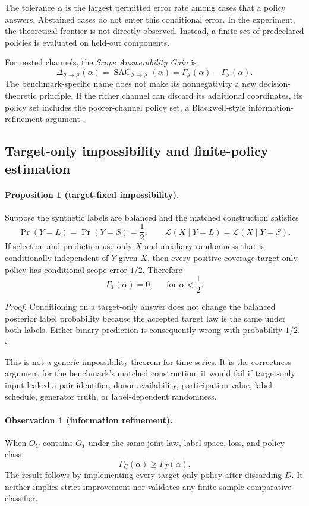 The tolerance $\alpha$ is the largest permitted error rate among cases that a
policy answers. Abstained cases do not enter this conditional error. In the
experiment, the theoretical frontier is not directly observed. Instead, a
finite set of predeclared policies is evaluated on held-out components.

For nested channels, the \emph{Scope Answerability Gain} is
\[
  \Delta_{\mathcal I\to\mathcal J}(\alpha)
  =\operatorname{SAG}_{\mathcal I\to\mathcal J}(\alpha)
  =\Gamma_{\mathcal J}(\alpha)-\Gamma_{\mathcal I}(\alpha).
\]
The benchmark-specific name does not make its nonnegativity a new
decision-theoretic principle. If the richer channel can discard its additional
coordinates, its policy set includes the poorer-channel policy set, a
Blackwell-style information-refinement argument \citep{blackwell1951,blackwell1953}.

\subsection{Target-only impossibility and finite-policy estimation}

\paragraph{Proposition 1 (target-fixed impossibility).}
Suppose the synthetic labels are balanced and the matched construction
satisfies
\[
  \Pr(Y=L)=\Pr(Y=S)=\frac12,\qquad
  \mathcal L(X\mid Y=L)=\mathcal L(X\mid Y=S).
\]
If selection and prediction use only $X$ and auxiliary randomness that is
conditionally independent of $Y$ given $X$, then every positive-coverage
target-only policy has conditional scope error $1/2$. Therefore
\[
  \Gamma_T(\alpha)=0\qquad\text{for }\alpha<\frac12.
\]

\noindent\emph{Proof.} Conditioning on a target-only answer does not change
the balanced posterior label probability because the accepted target law is
the same under both labels. Either binary prediction is consequently wrong
with probability $1/2$. \hfill$\square$

This is not a generic impossibility theorem for time series. It is the
correctness argument for the benchmark's matched construction: it would fail
if target-only input leaked a pair identifier, donor availability, participation
value, label schedule, generator truth, or label-dependent randomness.

\paragraph{Observation 1 (information refinement).}
When $O_C$ contains $O_T$ under the same joint law, label space, loss, and
policy class,
\[
  \Gamma_C(\alpha)\geq\Gamma_T(\alpha).
\]
The result follows by implementing every target-only policy after discarding
$D$. It neither implies strict improvement nor validates any finite-sample
comparative classifier.

